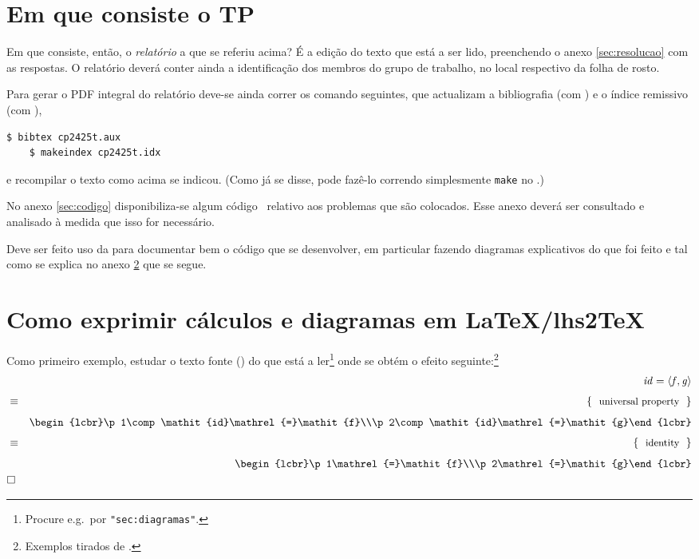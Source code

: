\documentclass[11pt, a4paper, fleqn]{article}
\newcommand{\Varid}[1]{\mathit{#1}}
\begin{document}
\section{Em que consiste o TP}

Em que consiste, então, o \emph{relatório} a que se referiu acima?
É a edição do texto que está a ser lido, preenchendo o anexo \ref{sec:resolucao}
com as respostas. O relatório deverá conter ainda a identificação dos membros
do grupo de trabalho, no local respectivo da folha de rosto.

Para gerar o PDF integral do relatório deve-se ainda correr os comando seguintes,
que actualizam a bibliografia (com \Bibtex) e o índice remissivo (com \Makeindex),
\begin{Verbatim}[fontsize=\small]
    $ bibtex cp2425t.aux
    $ makeindex cp2425t.idx
\end{Verbatim}
e recompilar o texto como acima se indicou. (Como já se disse, pode fazê-lo
correndo simplesmente \texttt{make} no \container.)

No anexo \ref{sec:codigo} disponibiliza-se algum código \Haskell\ relativo
aos problemas que são colocados. Esse anexo deverá ser consultado e analisado
à medida que isso for necessário.

Deve ser feito uso da  para documentar bem o código que se
desenvolver, em particular fazendo diagramas explicativos do que foi feito e
tal como se explica no anexo \ref{sec:diagramas} que se segue.

\section{Como exprimir cálculos e diagramas em LaTeX/lhs2TeX} \label{sec:diagramas}

Como primeiro exemplo, estudar o texto fonte () do que está a ler\footnote{
Procure e.g.\ por \texttt{"sec:diagramas"}.} onde se obtém o efeito seguinte:\footnote{Exemplos
tirados de \cite{Ol18}.}
\begin{eqnarray*}
\start
\ensuremath{\Varid{id}\mathrel{=}\conj{\Varid{f}}{\Varid{g}}}
\just\equiv{ universal property }
\ensuremath{\begin{lcbr}\p1\comp \Varid{id}\mathrel{=}\Varid{f}\\\p2\comp \Varid{id}\mathrel{=}\Varid{g}\end{lcbr}}
\just\equiv{ identity }
\ensuremath{\begin{lcbr}\p1\mathrel{=}\Varid{f}\\\p2\mathrel{=}\Varid{g}\end{lcbr}}
\qed
\end{eqnarray*}
\end{document}
